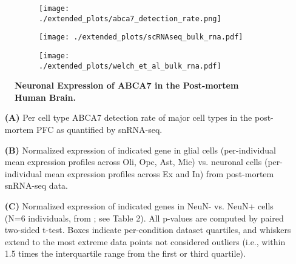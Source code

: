\begin{figure}[H]
    \begin{subfigure}[t]{.2\textwidth}
        \caption{}
        \texttt{[image: ./extended\_plots/abca7\_detection\_rate.png]}        
    \end{subfigure}
    \par
    \begin{subfigure}[t]{.7\textwidth}
        \caption{}
        \texttt{[image: ./extended\_plots/scRNAseq\_bulk\_rna.pdf]}        
    \end{subfigure}
    \par
    \begin{subfigure}[t]{.7\textwidth}
        \caption{}
        \texttt{[image: ./extended\_plots/welch\_et\_al\_bulk\_rna.pdf]}        
    \end{subfigure}
    \caption{
        \textbf{Neuronal Expression of ABCA7 in the Post-mortem Human Brain.}\\
    }
    \label{fig:abca7_expression}
\end{figure}
\begin{itemize}
    \item[\textbf{(A)}] Per cell type ABCA7 detection rate of major cell types in the post-mortem PFC as quantified by snRNA-seq. 
    \item[\textbf{(B)}] Normalized expression of indicated gene in glial cells (per-individual mean expression profiles across Oli, Opc, Ast, Mic) vs. neuronal cells (per-individual mean expression profiles across Ex and In) from post-mortem snRNA-seq data. 
    \item[\textbf{(C)}] Normalized expression of indicated genes in NeuN- vs. NeuN+ cells (N=6 individuals, from \cite{Welch2022-aa}; see Table 2). All p-values are computed by paired two-sided t-test. Boxes indicate per-condition dataset quartiles, and whiskers extend to the most extreme data points not considered outliers (i.e., within 1.5 times the interquartile range from the first or third quartile).
\end{itemize}